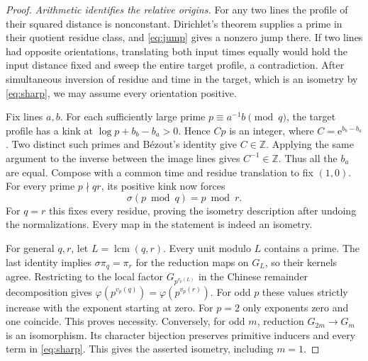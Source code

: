 \documentclass[11pt]{article}
\newcommand{\Z}{\mathbb Z}
\newcommand{\e}{\mathrm e}
\begin{document}
\begin{proof}
\emph{Arithmetic identifies the relative origins.}
For any two lines the profile of their squared distance is nonconstant. Dirichlet's theorem supplies a prime in their quotient residue class, and \eqref{eq:jump} gives a nonzero jump there. If two lines had opposite orientations, translating both input times equally would hold the input distance fixed and sweep the entire target profile, a contradiction. After simultaneous inversion of residue and time in the target, which is an isometry by \eqref{eq:sharp}, we may assume every orientation positive.

Fix lines $a,b$. For each sufficiently large prime $p\equiv a^{-1}b\pmod q$, the target profile has a kink at $\log p+b_b-b_a>0$. Hence $Cp$ is an integer, where $C=\e^{b_b-b_a}$. Two distinct such primes and B\'ezout's identity give $C\in\Z$. Applying the same argument to the inverse between the image lines gives $C^{-1}\in\Z$. Thus all the $b_a$ are equal. Compose with a common time and residue translation to fix $(1,0)$. For every prime $p\nmid qr$, its positive kink now forces
\[
 \sigma(p\bmod q)=p\bmod r .
\]
For $q=r$ this fixes every residue, proving the isometry description after undoing the normalizations. Every map in the statement is indeed an isometry.

For general $q,r$, let $L=\operatorname{lcm}(q,r)$. Every unit modulo $L$ contains a prime. The last identity implies $\sigma\pi_q=\pi_r$ for the reduction maps on $G_L$, so their kernels agree. Restricting to the local factor $G_{p^{v_p(L)}}$ in the Chinese remainder decomposition gives $\varphi(p^{v_p(q)})=\varphi(p^{v_p(r)})$. For odd $p$ these values strictly increase with the exponent starting at zero. For $p=2$ only exponents zero and one coincide. This proves necessity. Conversely, for odd $m$, reduction $G_{2m}\to G_m$ is an isomorphism. Its character bijection preserves primitive inducers and every term in \eqref{eq:sharp}. This gives the asserted isometry, including $m=1$.
\end{proof}
\end{document}
